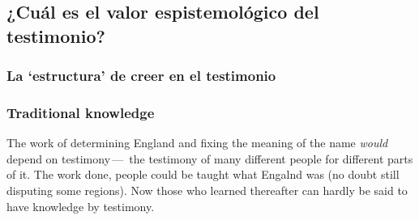 \subsection{¿Cuál es el valor espistemológico del testimonio?}

\subsubsection{La `estructura' de creer en el testimonio}

\subsubsection{Traditional knowledge}

The work of determining England and fixing the meaning of the name \emph{would} depend on testimony\,---\, the testimony of many different people for different parts of it. The work done, people could be taught what Engalnd was (no doubt still disputing some regions). Now those who learned thereafter can hardly be said to have knowledge by testimony.
